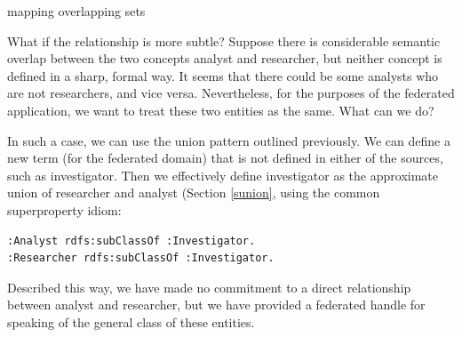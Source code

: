 \begin{challenge}{mapping overlapping sets}
\label{chal:6}

What if the relationship is more subtle? Suppose there is considerable
semantic overlap between the two concepts analyst and researcher, but
neither concept is defined in a sharp, formal way. It seems that there
could be some analysts who are not researchers, and vice versa.
Nevertheless, for the purposes of the federated application, we want to
treat these two entities as the same. What can we do?

\solution

In such a case, we can use the union pattern outlined previously. We can
define a new term (for the federated domain) that is not defined in
either of the sources, such as investigator. Then we effectively define
investigator as the approximate union of researcher and analyst (Section \ref{sunion}, using the common
superproperty idiom:

\begin{lstlisting}
:Analyst rdfs:subClassOf :Investigator.
:Researcher rdfs:subClassOf :Investigator.
\end{lstlisting}

Described this way, we have made no commitment to a direct relationship
between analyst and researcher, but we have provided a federated handle
for speaking of the general class of these entities.
\end{challenge}


